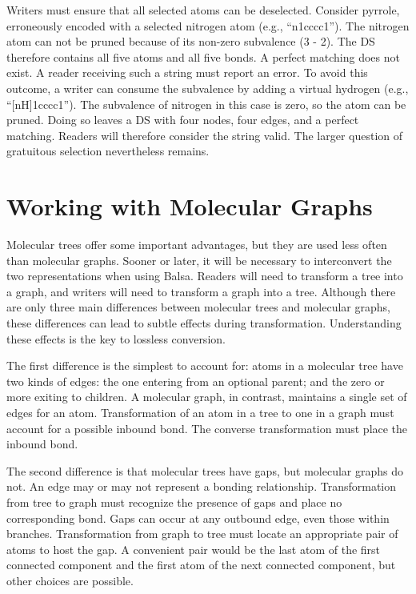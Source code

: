 \documentclass{article}
\begin{document}
Writers must ensure that all selected atoms can be deselected. Consider pyrrole, erroneously encoded with a selected nitrogen atom (e.g., \enquote{n1cccc1}). The nitrogen atom can not be pruned because of its non-zero subvalence (3 - 2). The DS therefore contains all five atoms and all five bonds. A perfect matching does not exist. A reader receiving such a string must report an error. To avoid this outcome, a writer can consume the subvalence by adding a virtual hydrogen (e.g., \enquote{[nH]1cccc1}). The subvalence of nitrogen in this case is zero, so the atom can be pruned. Doing so leaves a DS with four nodes, four edges, and a perfect matching. Readers will therefore consider the string valid. The larger question of gratuitous selection nevertheless remains.

\section*{Working with Molecular Graphs}
\label{working-with-molecular-graphs}

Molecular trees offer some important advantages, but they are used less often than molecular graphs. Sooner or later, it will be necessary to interconvert the two representations when using Balsa. Readers will need to transform a tree into a graph, and writers will need to transform a graph into a tree. Although there are only three main differences between molecular trees and molecular graphs, these differences can lead to subtle effects during transformation. Understanding these effects is the key to lossless conversion.

The first difference is the simplest to account for: atoms in a molecular tree have two kinds of edges: the one entering from an optional parent; and the zero or more exiting to children. A molecular graph, in contrast, maintains a single set of edges for an atom. Transformation of an atom in a tree to one in a graph must account for a possible inbound bond. The converse transformation must place the inbound bond.

The second difference is that molecular trees have gaps, but molecular graphs do not. An edge may or may not represent a bonding relationship. Transformation from tree to graph must recognize the presence of gaps and place no corresponding bond. Gaps can occur at any outbound edge, even those within branches. Transformation from graph to tree must locate an appropriate pair of atoms to host the gap. A convenient pair would be the last atom of the first connected component and the first atom of the next connected component, but other choices are possible.
\end{document}
